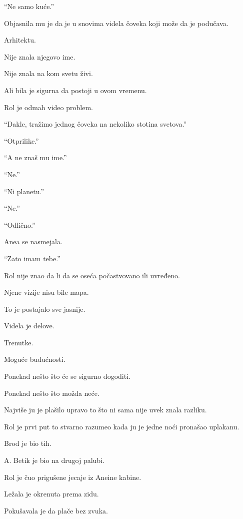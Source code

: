 ``Ne samo kuće.''

\bigskip

Objasnila mu je da je u snovima videla čoveka koji može da je podučava.

Arhitektu.

Nije znala njegovo ime.

Nije znala na kom svetu živi.

Ali bila je sigurna da postoji u ovom vremenu.

\bigskip

Rol je odmah video problem.

``Dakle, tražimo jednog čoveka na nekoliko stotina svetova.''

``Otprilike.''

``A ne znaš mu ime.''

``Ne.''

``Ni planetu.''

``Ne.''

``Odlično.''

\bigskip

Anea se nasmejala.

``Zato imam tebe.''

\bigskip

Rol nije znao da li da se oseća počastvovano ili uvređeno.

\bigskip

Njene vizije nisu bile mapa.

To je postajalo sve jasnije.

Videla je delove.

Trenutke.

Moguće budućnosti.

Ponekad nešto što će se sigurno dogoditi.

Ponekad nešto što možda neće.

\bigskip

Najviše ju je plašilo upravo to što ni sama nije uvek znala razliku.

\bigskip

Rol je prvi put to stvarno razumeo kada ju je jedne noći pronašao uplakanu.

Brod je bio tih.

A. Betik je bio na drugoj palubi.

Rol je čuo prigušene jecaje iz Aneine kabine.

\bigskip

Ležala je okrenuta prema zidu.

Pokušavala je da plače bez zvuka.

